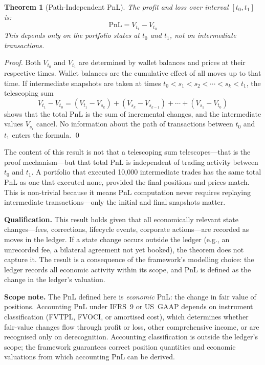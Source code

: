 \documentclass[11pt,a4paper]{article}
\newtheorem{theorem}[definition]{Theorem}
\begin{document}
\begin{theorem}[Path-Independent PnL]
The profit and loss over interval $[t_0, t_1]$ is:
\[
\text{PnL} = V_{t_1} - V_{t_0}
\]
This depends only on the portfolio states at $t_0$ and $t_1$, not on intermediate transactions.
\end{theorem}

\noindent\textit{Proof.} Both $V_{t_0}$ and $V_{t_1}$ are determined by wallet balances and prices at their respective times. Wallet balances are the cumulative effect of all moves up to that time. If intermediate snapshots are taken at times $t_0 < s_1 < s_2 < \cdots < s_k < t_1$, the telescoping sum
\[
V_{t_1} - V_{t_0} = (V_{t_1} - V_{s_k}) + (V_{s_k} - V_{s_{k-1}}) + \cdots + (V_{s_1} - V_{t_0})
\]
shows that the total PnL is the sum of incremental changes, and the intermediate values $V_{s_i}$ cancel. No information about the path of transactions between $t_0$ and $t_1$ enters the formula. \qed

\noindent The content of this result is not that a telescoping sum telescopes---that is the proof mechanism---but that total PnL is independent of trading activity between $t_0$ and $t_1$. A portfolio that executed 10{,}000 intermediate trades has the same total PnL as one that executed none, provided the final positions and prices match. This is non-trivial because it means PnL computation never requires replaying intermediate transactions---only the initial and final snapshots matter.

\noindent\textbf{Qualification.} This result holds given that all economically relevant state changes---fees, corrections, lifecycle events, corporate actions---are recorded as moves in the ledger. If a state change occurs outside the ledger (e.g., an unrecorded fee, a bilateral agreement not yet booked), the theorem does not capture it. The result is a consequence of the framework's modelling choice: the ledger records all economic activity within its scope, and PnL is defined as the change in the ledger's valuation.

\noindent\textbf{Scope note.} The PnL defined here is \textit{economic} PnL: the change in fair value of positions. Accounting PnL under IFRS~9 or US~GAAP depends on instrument classification (FVTPL, FVOCI, or amortised cost), which determines whether fair-value changes flow through profit or loss, other comprehensive income, or are recognised only on derecognition. Accounting classification is outside the ledger's scope; the framework guarantees correct position quantities and economic valuations from which accounting PnL can be derived.
\end{document}
